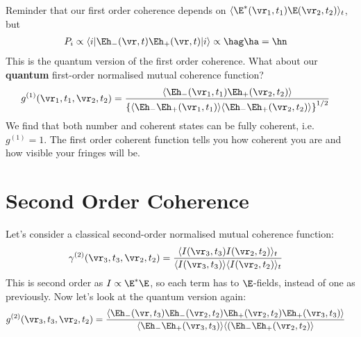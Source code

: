 \documentclass[a4paper, 11pt, normalem]{report}
\begin{document}
Reminder that our first order coherence depends on $\langle\E^*(\vr_1,t_1)\E(\vr_2,t_2)\rangle_t$, but
\begin{align}
    P_i &\propto \langle i|\Eh_-(\vr,t)\Eh_+(\vr,t)|i\rangle \propto \hag\ha = \hn
\end{align}
This is the quantum version of the first order coherence. 
What about our \textbf{quantum} first-order normalised mutual coherence function?
\begin{align}
    g^{(1)}(\vr_1,t_1,\vr_2,t_2) &= \frac{\langle\Eh_-(\vr_1,t_1)\Eh_+(\vr_2,t_2)\rangle}{\left\{\langle\Eh_-\Eh_+(\vr_1,t_1)\rangle\langle\Eh_-\Eh_+(\vr_2,t_2)\rangle\right\}^{1/2}}
\end{align}
We find that both number and coherent states can be fully coherent, i.e. $g^{(1)}=1$.
The first order coherent function tells you how coherent you are and how visible your fringes will be. 

\section{Second Order Coherence}
\begin{figure}[H]
    \centering
\end{figure}
Let's consider a classical second-order normalised mutual coherence function:
\begin{align}
    \gamma^{(2)}(\vr_3,t_3,\vr_2,t_2) &= \frac{\langle I(\vr_3,t_3)I(\vr_2,t_2)\rangle_t}{\langle I(\vr_3,t_3)\rangle\langle I(\vr_2,t_2)\rangle_t}
\end{align}
This is second order as $I \propto \E^*\E$, so each term has to $\E$-fields, instead of one as previously.
Now let's look at the quantum version again:
\begin{align}
    g^{(2)}(\vr_3,t_3,\vr_2,t_2) &= \frac{\langle\Eh_-(\vr,t_3)\Eh_-(\vr_2,t_2)\Eh_+(\vr_2,t_2)\Eh_+(\vr_3,t_3)\rangle}{\langle\Eh_-\Eh_+(\vr_3,t_3)\rangle\langle(\Eh_-\Eh_+(\vr_2,t_2)\rangle}
\end{align}
\end{document}
